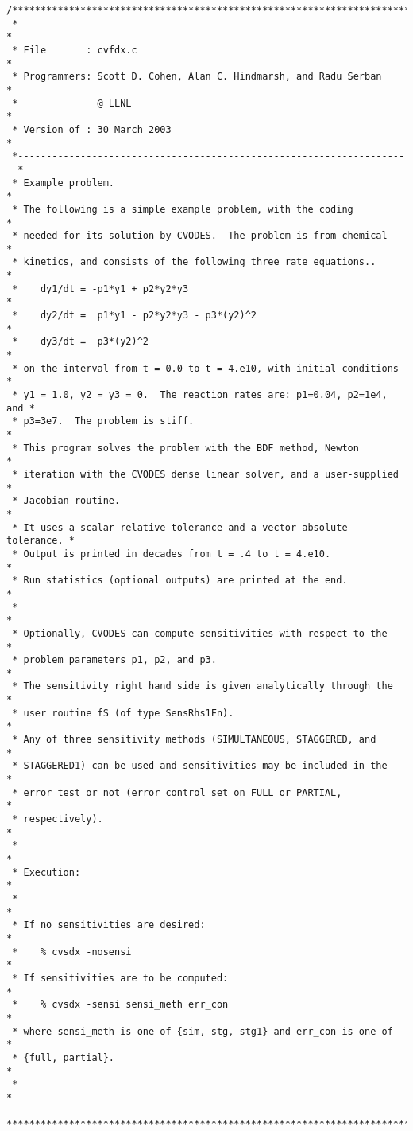 \begin{verbatim}
/************************************************************************
 *                                                                      *
 * File       : cvfdx.c                                                 *
 * Programmers: Scott D. Cohen, Alan C. Hindmarsh, and Radu Serban      * 
 *              @ LLNL                                                  *
 * Version of : 30 March 2003                                           *
 *----------------------------------------------------------------------*
 * Example problem.                                                     *
 * The following is a simple example problem, with the coding           *
 * needed for its solution by CVODES.  The problem is from chemical     *
 * kinetics, and consists of the following three rate equations..       *
 *    dy1/dt = -p1*y1 + p2*y2*y3                                        *
 *    dy2/dt =  p1*y1 - p2*y2*y3 - p3*(y2)^2                            *
 *    dy3/dt =  p3*(y2)^2                                               *
 * on the interval from t = 0.0 to t = 4.e10, with initial conditions   *
 * y1 = 1.0, y2 = y3 = 0.  The reaction rates are: p1=0.04, p2=1e4, and *
 * p3=3e7.  The problem is stiff.                                       *
 * This program solves the problem with the BDF method, Newton          *
 * iteration with the CVODES dense linear solver, and a user-supplied   *
 * Jacobian routine.                                                    * 
 * It uses a scalar relative tolerance and a vector absolute tolerance. *
 * Output is printed in decades from t = .4 to t = 4.e10.               *
 * Run statistics (optional outputs) are printed at the end.            *
 *                                                                      *
 * Optionally, CVODES can compute sensitivities with respect to the     *
 * problem parameters p1, p2, and p3.                                   *
 * The sensitivity right hand side is given analytically through the    *
 * user routine fS (of type SensRhs1Fn).                                *
 * Any of three sensitivity methods (SIMULTANEOUS, STAGGERED, and       *
 * STAGGERED1) can be used and sensitivities may be included in the     *
 * error test or not (error control set on FULL or PARTIAL,             *
 * respectively).                                                       *
 *                                                                      *
 * Execution:                                                           *
 *                                                                      *
 * If no sensitivities are desired:                                     *
 *    % cvsdx -nosensi                                                  *
 * If sensitivities are to be computed:                                 *
 *    % cvsdx -sensi sensi_meth err_con                                 *
 * where sensi_meth is one of {sim, stg, stg1} and err_con is one of    *
 * {full, partial}.                                                     * 
 *                                                                      *
 ************************************************************************/


\end{verbatim}
